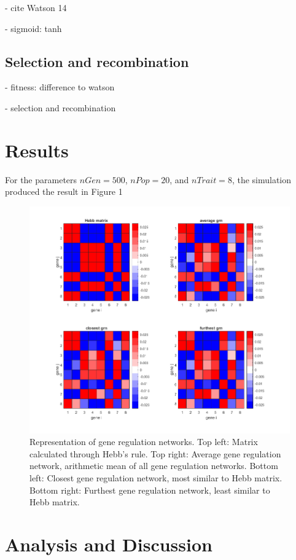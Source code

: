 \documentclass{article}
\begin{document}
- cite Watson 14 

- sigmoid: tanh

\subsection{Selection and recombination}
- fitness: difference to watson

- selection and recombination



\section{Results}

For the parameters $nGen = 500$, $nPop = 20$, and $nTrait = 8$, the simulation produced the result in Figure 1


\begin{figure}[H]
	\includegraphics[width=\linewidth]{./img/results/pop100.png}
	\caption{Representation of gene regulation networks. Top left: Matrix calculated through Hebb's rule. Top right: Average gene regulation network, arithmetic mean of all gene regulation networks. Bottom left: Closest gene regulation network, most similar to Hebb matrix. Bottom right: Furthest gene regulation network, least similar to Hebb matrix.}
	\label{fig:pop100}
\end{figure}


\section{Analysis and Discussion}
\end{document}
